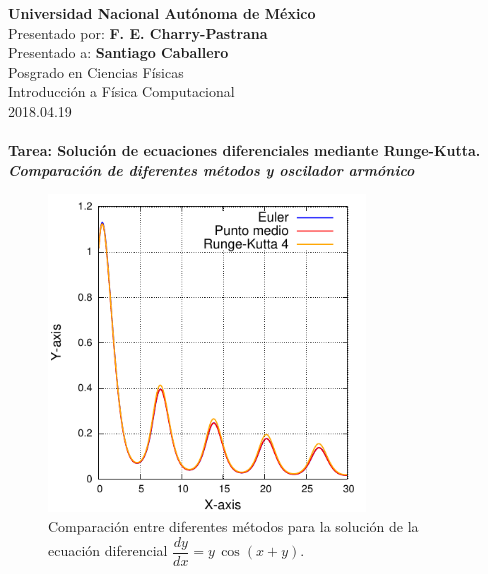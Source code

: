 \documentclass[12pt,letterpaper]{article}
\author{F\'elix Ernesto Charry Pastrana}
\begin{document}
\textbf{Universidad Nacional Autónoma de México }\\
Presentado por: \textbf{F. E. Charry-Pastrana}\\
Presentado a: \textbf{Santiago Caballero} \\
Posgrado en Ciencias Físicas \\
Introducción a Física Computacional \\
2018.04.19 \\
\\
\textbf{{\Large Tarea: Solución de ecuaciones diferenciales mediante Runge-Kutta. \textit{Comparación de diferentes métodos y oscilador armónico}}}
\begin{figure}[h]
\centering
\includegraphics[width=0.75\textwidth]{Parte_A.pdf}
\caption{Comparación entre diferentes métodos para la solución de la ecuación diferencial $\dfrac{dy}{dx} = y\,\cos(x+y)$.}
\end{figure}
\end{document}
